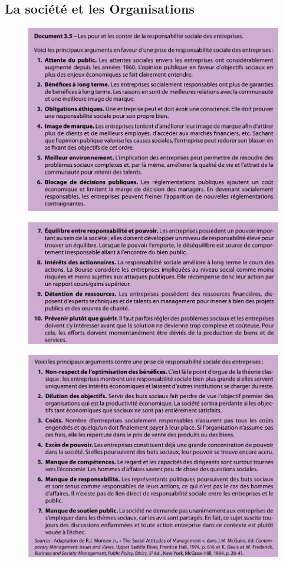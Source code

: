 \documentclass[letterpaper, 12pt]{article}
\begin{document}
	\subsection{La soci\'et\'e et les Organisations}
		\begin{figure}[H]
			\centering
			\includegraphics[scale=0.725]{Images/societeplus1}
		\end{figure}
		\begin{figure}[H]
			\centering
			\includegraphics[scale=0.725]{Images/societeplus2}
		\end{figure}\noindent
		\begin{figure}[H]
			\centering
			\includegraphics[scale=0.725]{Images/societemoins}
		\end{figure}\noindent
\end{document}
